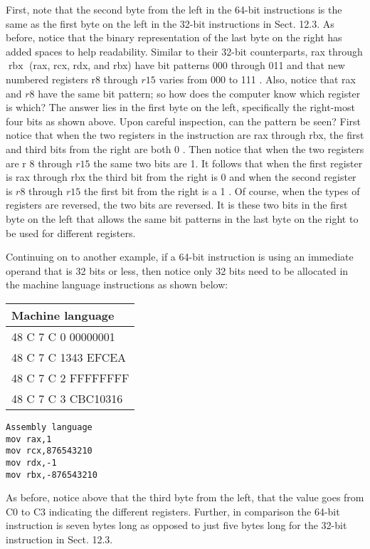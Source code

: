 \documentclass[10pt]{article}
\begin{document}
First, note that the second byte from the left in the 64-bit instructions is the same as the first byte on the left in the 32-bit instructions in Sect. 12.3. As before, notice that the binary representation of the last byte on the right has added spaces to help readability. Similar to their 32-bit counterparts, rax through $\operatorname{rbx}$ (rax, rcx, rdx, and rbx) have bit patterns 000 through 011 and that new numbered registers r8 through $r 15$ varies from 000 to 111 . Also, notice that rax and $r 8$ have the same bit pattern; so how does the computer know which register is which? The answer lies in the first byte on the left, specifically the right-most four bits as shown above. Upon careful inspection, can the pattern be seen? First notice that when the two registers in the instruction are rax through rbx, the first and third bits from the right are both 0 . Then notice that when the two registers are r 8 through $r 15$ the same two bits are 1. It follows that when the first register is rax through rbx the third bit from the right is 0 and when the second register is $r 8$ through $r 15$ the first bit from the right is a 1 . Of course, when the types of registers are reversed, the two bits are reversed. It is these two bits in the first byte on the left that allows the same bit patterns in the last byte on the right to be used for different registers.

Continuing on to another example, if a 64-bit instruction is using an immediate operand that is 32 bits or less, then notice only 32 bits need to be allocated in the machine language instructions as shown below:

\begin{center}
\begin{tabular}{|l|}
\hline
Machine language \\
\hline
48 C 7 C 0 00000001 \\
\hline
48 C 7 C 1343 EFCEA \\
\hline
48 C 7 C 2 FFFFFFFF \\
\hline
48 C 7 C 3 CBC10316 \\
\hline
\end{tabular}
\end{center}

\begin{verbatim}
Assembly language
mov rax,1
mov rcx,876543210
mov rdx,-1
mov rbx,-876543210
\end{verbatim}

As before, notice above that the third byte from the left, that the value goes from C0 to C3 indicating the different registers. Further, in comparison the 64-bit instruction is seven bytes long as opposed to just five bytes long for the 32-bit instruction in Sect. 12.3.
\end{document}
